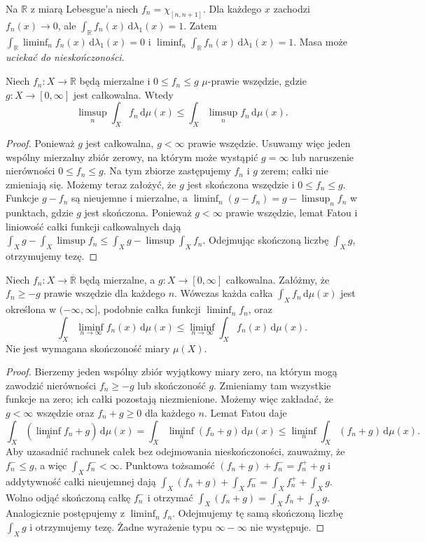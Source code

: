 \begin{przyklad}
Na $\mathbb R$ z miarą Lebesgue'a niech
$f_n=\chi_{[n,n+1]}$. Dla każdego $x$ zachodzi
$f_n(x)\to0$, ale $\int_{\mathbb R} f_n(x)\,\mathrm d\lambda_1(x)=1$.
Zatem $\int_{\mathbb R}\liminf_nf_n(x)\,\mathrm d\lambda_1(x)=0$
i $\liminf_n\int_{\mathbb R} f_n(x)\,\mathrm d\lambda_1(x)=1$.
Masa może \emph{uciekać do nieskończoności}.
\end{przyklad}

\begin{wniosek}
\label{cor:reverse-fatou}
Niech $f_n:X\to\mathbb R$ będą mierzalne i
$0\le f_n\le g$ $\mu$-prawie wszędzie, gdzie
$g:X\to[0,\infty]$ jest całkowalna. Wtedy
\[
\limsup_n\int_Xf_n\,\mathrm d\mu(x)
\le\int_X\limsup_nf_n\,\mathrm d\mu(x).
\]
\end{wniosek}
\begin{proof}
Ponieważ $g$ jest całkowalna, $g<\infty$ prawie
wszędzie. Usuwamy więc jeden wspólny mierzalny
zbiór zerowy, na którym może wystąpić $g=\infty$
lub naruszenie nierówności $0\le f_n\le g$.
Na tym zbiorze zastępujemy $f_n$ i $g$ zerem;
całki nie zmieniają się. Możemy teraz założyć,
że $g$ jest skończona wszędzie i $0\le f_n\le g$.
Funkcje $g-f_n$ są nieujemne i mierzalne, a
$\liminf_n(g-f_n)=g-\limsup_nf_n$ w punktach,
gdzie $g$ jest skończona. Ponieważ $g<\infty$
prawie wszędzie, lemat Fatou i liniowość całki
funkcji całkowalnych dają
$\int_X g-\int_X\limsup f_n\le
\int_X g-\limsup\int_X f_n$.
Odejmując skończoną liczbę $\int_X g$,
otrzymujemy tezę.
\end{proof}

\begin{twierdzenie}
\label{thm:fatou-integrable-lower-8}
Niech $f_n:X\to\overline{\mathbb R}$ będą mierzalne,
a $g:X\to[0,\infty]$ całkowalna. Załóżmy,
że $f_n\ge-g$ prawie wszędzie dla każdego $n$.
Wówczas każda całka $\int_Xf_n\,\mathrm d\mu(x)$
jest określona w $(-\infty,\infty]$, podobnie całka
funkcji $\liminf_nf_n$, oraz
\[
\int_X\liminf_{n\to\infty}f_n(x)\,\mathrm d\mu(x)
\le \liminf_{n\to\infty}\int_Xf_n(x)\,\mathrm d\mu(x).
\]
Nie jest wymagana skończoność miary $\mu(X)$.
\end{twierdzenie}
\begin{proof}
Bierzemy jeden wspólny zbiór wyjątkowy miary zero,
na którym mogą zawodzić nierówności $f_n\ge-g$
lub skończoność $g$. Zmieniamy tam wszystkie
funkcje na zero; ich całki pozostają niezmienione.
Możemy więc zakładać, że $g<\infty$ wszędzie oraz
$f_n+g\ge0$ dla każdego $n$. Lemat Fatou daje
\[
\int_X(\liminf_nf_n+g)\,\mathrm d\mu(x)
=\int_X\liminf_n(f_n+g)\,\mathrm d\mu(x)
\le\liminf_n\int_X(f_n+g)\,\mathrm d\mu(x).
\]
Aby uzasadnić rachunek całek bez odejmowania
nieskończoności, zauważmy, że $f_n^-\le g$,
a więc $\int_X f_n^-<\infty$. Punktowa tożsamość
$(f_n+g)+f_n^-=f_n^++g$ i addytywność całki
nieujemnej dają
$\int_X(f_n+g)+\int_Xf_n^-=
\int_Xf_n^++\int_Xg$.
Wolno odjąć skończoną całkę $f_n^-$ i otrzymać
$\int_X(f_n+g)=\int_Xf_n+\int_Xg$.
Analogicznie postępujemy z $\liminf_nf_n$.
Odejmujemy tę samą skończoną liczbę $\int_Xg$
i otrzymujemy tezę. Żadne wyrażenie typu
$\infty-\infty$ nie występuje.
\end{proof}

